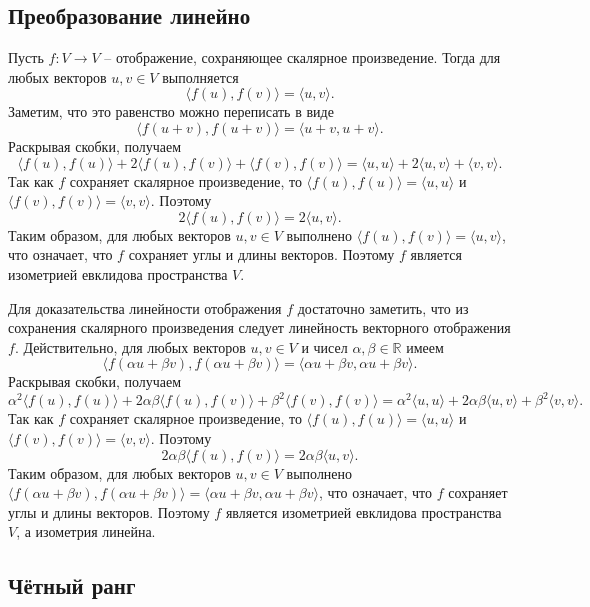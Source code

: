  \subsection*{Преобразование линейно}

Пусть $f: V \to V$ -- отображение, сохраняющее скалярное произведение.
Тогда для любых векторов $u,v \in V$ выполняется
\[ \langle f(u), f(v) \rangle = \langle u,v \rangle. \]
Заметим, что это равенство можно переписать в виде
\[ \langle f(u+v), f(u+v) \rangle = \langle u+v,u+v \rangle. \]
Раскрывая скобки, получаем
\[ \langle f(u),f(u) \rangle + 2\langle f(u),f(v) \rangle + \langle f(v),f(v) \rangle = \langle u,u \rangle + 2\langle u,v \rangle + \langle v,v \rangle. \]
Так как $f$ сохраняет скалярное произведение, то $\langle f(u),f(u) \rangle = \langle u,u \rangle$ и $\langle f(v),f(v) \rangle = \langle v,v \rangle$.
Поэтому
\[ 2\langle f(u),f(v) \rangle = 2\langle u,v \rangle. \]
Таким образом, для любых векторов $u,v \in V$ выполнено $\langle f(u),f(v) \rangle = \langle u,v \rangle$, что
означает, что $f$ сохраняет углы и длины векторов.
Поэтому $f$ является изометрией евклидова пространства $V$.

Для доказательства линейности отображения $f$ достаточно заметить, что из сохранения скалярного произведения следует
линейность векторного отображения $f$.
Действительно, для любых векторов $u,v \in V$ и чисел $\alpha, \beta \in \mathbb{R}$ имеем
\[ \langle f(\alpha u + \beta v),f(\alpha u + \beta v) \rangle = \langle \alpha u + \beta v, \alpha u + \beta v \rangle. \]
Раскрывая скобки, получаем
\[ \alpha^2 \langle f(u),f(u) \rangle + 2\alpha\beta \langle f(u),f(v) \rangle + \beta^2 \langle f(v),f(v) \rangle = \alpha^2 \langle u,u \rangle + 2\alpha\beta \langle u,v \rangle + \beta^2 \langle v,v \rangle. \]
Так как $f$ сохраняет скалярное произведение, то $\langle f(u),f(u) \rangle = \langle u,u \rangle$ и $\langle f(v),f(v) \rangle = \langle v,v \rangle$.
Поэтому
\[ 2\alpha\beta \langle f(u),f(v) \rangle = 2\alpha\beta \langle u,v \rangle. \]
Таким образом, для любых векторов $u,v \in V$ выполнено $\langle f(\alpha u + \beta v),f(\alpha u + \beta v) \rangle = \langle \alpha u + \beta v, \alpha u + \beta v \rangle$, что
означает, что $f$ сохраняет углы и длины векторов.
Поэтому $f$ является изометрией евклидова пространства $V$, а изометрия линейна.

 \subsection*{Чётный ранг}

